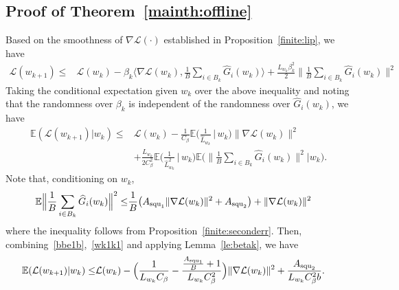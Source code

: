 \documentclass{osudissert96}
\begin{document}
\subsection*{Proof of Theorem~\ref{mainth:offline}}
	Based on the smoothness of $\nabla \mathcal{L}(\cdot)$ established in Proposition~\ref{finite:lip}, we have
	\begin{align*}
	\mathcal{L}(w_{k+1}) 
	 \leq &\mathcal{L}(w_k) -\beta_k\Big \langle \nabla \mathcal{L}(w_k), \frac{1}{B}\sum_{i\in B_k} \widehat G_i(w_k)\Big\rangle + \frac{L_{w_k}\beta_k^2}{2}\Big\|\frac{1}{B}\sum_{i\in B_k} \widehat G_i(w_k)\Big\|^2 \nonumber
	\end{align*}
	Taking the conditional expectation given $w_k$ over the above inequality and noting that the randomness over $\beta_k$ is independent of the randomness over $ \widehat G_i(w_k)$,  we have 
	\begin{align}\label{wk1k1}
	\mathbb{E}	(\mathcal{L}(w_{k+1})  | w_k)  \leq &\mathcal{L}(w_{k}) - \frac{1}{C_\beta}\mathbb{E}\Big(\frac{1}{\hat L_{w_k}} \,\Big |\, w_k\Big) \|\nabla \mathcal{L}(w_{k}) \|^2 \nonumber
	\\&+  \frac{L_{w_k}}{2C_\beta^2}\mathbb{E}\Big(\frac{1}{\hat L^2_{w_k}} \,\Big |\, w_k\Big) \mathbb{E} \Big(  \Big\|\frac{1}{B}\sum_{i\in B_k} \widehat G_i(w_k)\Big\|^2  \Big| w_k   \Big).
	\end{align}
	Note that, conditioning on $w_k$,
	\begin{align}\label{bbe1b}
	\mathbb{E}  \Big\|\frac{1}{B}\sum_{i\in B_k} \widehat G_i(w_k)\Big\|^2   
	\leq & \frac{1}{B}\big(  A_{\text{\normalfont squ}_1} \|\nabla \mathcal{L}(w_k)\|^2 + A_{\text{\normalfont squ}_2}   \big)  + \|\nabla \mathcal{L}(w_k)\|^2
	\end{align}
	where the inequality follows from Proposition~\ref{finite:seconderr}. Then, combining~\cref{bbe1b},~\cref{wk1k1} and applying Lemma~\ref{le:betak}, we have 
	\begin{align}\label{lwkpkps}
	\mathbb{E}	(\mathcal{L}(w_{k+1})  | w_k)
	 \leq & \mathcal{L}(w_{k})  - \Big(  \frac{1}{L_{w_k}C_\beta}  - \frac{\frac{A_{\text{\normalfont squ}_1}}{B}+1}{L_{w_k}C_\beta^2}\Big)\|\nabla \mathcal{L}(w_k)\|^2 + \frac{A_{\text{\normalfont squ}_2}}{L_{w_k}C_\beta^2b}.
	\end{align}
\end{document}

